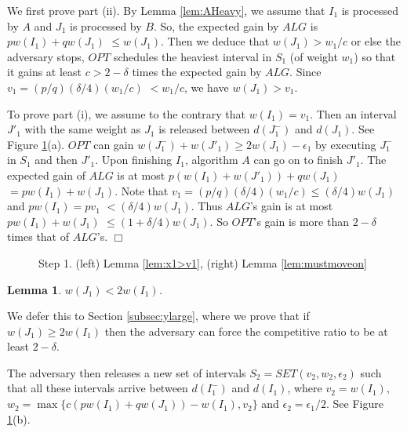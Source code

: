 \documentclass[11pt]{article}
\newtheorem{lemma}{Lemma}[section]
\newcommand{\qed}{\hspace*{\fill}$\Box$\par\medskip}
\newenvironment{proof}{\noindent{\it Proof. }\ignorespaces}{\qed}
\begin{document}
\begin{proof}
We first prove part (ii).
By Lemma \ref{lem:AHeavy}, we assume that $I_1$ is processed by $A$
and $J_1$ is processed by $B$.
So, the expected gain by $ALG$ is $p w(I_1) + q w(J_1)$ $\leq w(J_1)$.
Then we deduce that $w(J_1) > w_1/c$ or else the adversary stops,
$OPT$ schedules the heaviest interval in $S_1$ (of weight $w_1$)
so that it gains at least $c > 2-\delta$ times the expected gain
by $ALG$. 
Since $v_1 = (p/q)(\delta/4)(w_1/c)$ $< w_1/c$,
we have $w(J_1) > v_1$.

To prove part (i), we assume to the contrary that $w(I_1)=v_1$.
Then an interval $J'_1$ with the same weight as $J_1$
is released between $d(J_1^-)$ and $d(J_1)$.
See Figure \ref{fig:step1}(a).
$OPT$ can gain $w(J^-_1) + w(J'_1) \geq 2w(J_1) - \epsilon_1$
by executing $J^-_1$ in $S_1$ and then $J'_1$.
Upon finishing $I_1$, algorithm $A$ can go on to finish $J'_1$.
The expected gain of $ALG$ is at most
$p (w(I_1) + w(J'_1)) + q w(J_1)$
$= pw(I_1) + w(J_1)$.
Note that 
$v_1 = (p/q)(\delta/4)(w_1/c) \leq (\delta/4) w(J_1)$
and $p w(I_1) = p v_1$ $< (\delta/4) w(J_1)$.
Thus $ALG$'s gain is at most
$p w(I_1) + w(J_1)$ $\leq (1 + \delta/4) w(J_1)$. 
So $OPT$'s gain is more than $2-\delta$ times that of
$ALG$'s.
\end{proof}

\begin{figure}
\centerline{ \epsfysize=1.1in  
             \hspace{0.8in}
             \epsfysize=1.40in  }
\caption{Step 1. (left) Lemma \ref{lem:x1>v1}, 
  (right) Lemma \ref{lem:mustmoveon} }
\label{fig:step1}
\end{figure}

\begin{lemma} \label{lem:case1}
$w(J_1) < 2 w(I_1)$.
\end{lemma}

We defer this to Section \ref{subsec:ylarge},
where we prove that if $w(J_1) \geq 2 w(I_1)$ then the adversary
can force the competitive ratio to be at least $2-\delta$.

The adversary then releases a new set of intervals 
$S_2 = SET(v_2,w_2,\epsilon_2)$
such that all these intervals arrive between
$d(I^-_1)$ and $d(I_1)$,
where $v_2 = w(I_1)$,
$w_2 = \max\{ c(p w(I_1) + q w(J_1)) - w(I_1), v_2\}$
and $\epsilon_2 = \epsilon_1/2$.
See Figure \ref{fig:step1}(b).
\end{document}
